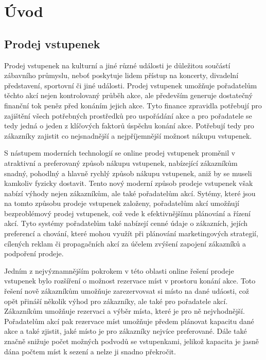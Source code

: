 \chapter*{Úvod}

\section*{Prodej vstupenek}
\label{sec:uvod-prodej-vstupenek}
Prodej vstupenek na kulturní a jiné různé události je důležitou součástí zábavního průmyslu, neboť poskytuje lidem přístup na koncerty, divadelní představení, sportovní či jiné události. Prodej vstupenek umožňuje pořadatelům těchto akcí nejen kontrolovaný průběh akce, ale především generuje dostatečný finanční tok peněz před konáním jejich akce. Tyto finance zpravidla potřebují pro zajištění všech potřebných prostředků pro uspořádání akce a pro pořadatele se tedy jedná o jeden z klíčových faktorů úspěchu konání akce. Potřebují tedy pro zákazníky zajistit co nejsnadnější a nejpříjemnější možnost nákupu vstupenek.

S nástupem moderních technologií se online prodej vstupenek proměnil v atraktivní a preferovaný způsob nákupu vstupenek, nabízející zákazníkům snadný, pohodlný a hlavně rychlý způsob nákupu vstupenek, aniž by se museli kamkoliv fyzicky dostavit. Tento nový moderní způsob prodeje vstupenek však nabízí výhody nejen zákazníkům, ale také pořadatelům akcí. Sytémy, které jsou na tomto způsobu prodeje vstupenek založeny, pořadatelům akcí umožňují bezproblémový prodej vstupenek, což vede k efektivnějšímu plánování a řízení akcí. Tyto systémy pořadatelům také nabízejí cenné údaje o zákazních, jejích preferencí a chování, které mohou využít při plánování marketingových strategií, cílených reklam či propagačních akcí za účelem zvýšení zapojení zákazníků a podpoření prodeje.

Jedním z nejvýznamnějším pokrokem v této oblasti online řešení prodeje vstupenek bylo rozšíření o možnost rezervace míst v prostoru konání akce. Toto řešení nově zákazníkům umožňuje zarezervovsat si místo na dané udáosti, což opět přináší několik výhod pro zákazníky, ale také pro pořadatele akcí. Zákazníkům umožňuje rezervaci a výběr místa, které je pro ně nejvhodnější. Pořadatelům akcí pak rezervace míst umožňuje předem plánovat kapacitu dané akce a také zjistit, jaké místo je pro zákazníky nejvíce preferované. Dále také značně snižuje počet možných podvodů se vstupenkami, jelikož kapacita je jasně dána počtem míst k sezení a nelze ji snadno překročit.

